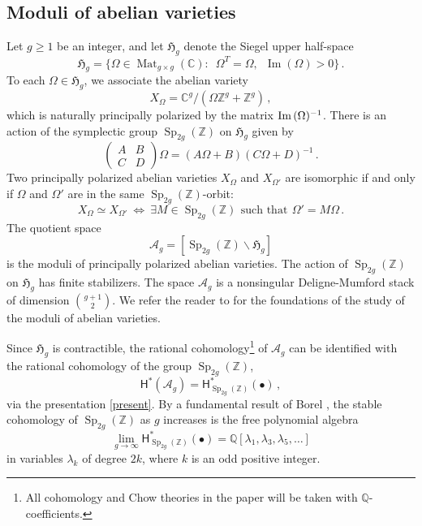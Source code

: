 \documentclass[11pt]{amsart}
\theoremstyle{definition}
\newcommand{\qq}{\mathbb{Q}}
\DeclareMathOperator{\Sp}{Sp}
\DeclareMathOperator{\im}{Im}
\begin{document}
\subsection{Moduli of abelian varieties} Let $g\geq 1$ be an integer, and let $\mathfrak H_g$ denote the Siegel upper half-space $$\mathfrak H_g=\{\Omega \in \operatorname {Mat} _{g \times g}(\mathbb {C} ):\,\,\,\Omega ^{T}=\Omega ,\,\,\,\im (\Omega )>0\} \, .$$ To each $\Omega\in \mathfrak H_g$, we associate the abelian variety $$X_{\Omega}=\mathbb C^{g}/(\Omega \mathbb Z^g+\mathbb Z^g)\, ,$$ which is naturally principally polarized by the matrix $\text{Im\,} (\Omega)^{-1}$. There is an action of the symplectic group $\Sp_{2g}(\mathbb Z)$ on $\mathfrak H_g$ given by 
$$\begin{pmatrix} A & B \\ C & D\end{pmatrix} \Omega= (A\Omega + B)(C\Omega+D)^{-1} \,.$$
Two principally polarized abelian varieties 
$X_{\Omega}$ and $X_{\Omega'}$
are isomorphic if and only if
$\Omega$ and $\Omega'$ are
in the same $\Sp_{2g}(\mathbb Z)$-orbit:
$$X_{\Omega}\simeq X_{\Omega'}\ \iff\  
\exists M\in \Sp_{2g}(\mathbb Z)  \ \, {\text {such that}} \
\, \Omega'=M\Omega\, .$$
The quotient space \begin{equation}\label{present}\mathcal A_g=\left[\Sp_{2g}(\mathbb Z)\backslash \mathfrak H_g\right]\end{equation} is the moduli  of principally polarized abelian varieties. The action of $\Sp_{2g}(\mathbb Z)$ on $\mathfrak H_g$ has finite stabilizers. The space $\mathcal A_g$ is a nonsingular Deligne-Mumford stack of dimension %
$\binom{g+1}{2}$.
We refer the reader to \cite{BL} for the 
foundations of the study of the moduli of
abelian varieties.

Since $\mathfrak{H}_g$
is contractible,
the rational cohomology{\footnote{All cohomology and Chow theories in the paper will be taken with $\qq$-coefficients.}} of $\mathcal A_g$ can be identified with the rational cohomology of the group $\Sp_{2g}(\mathbb Z)$,
$$\mathsf{H}^*(\mathcal{A}_g)=
\mathsf{H}^*_{\Sp_{2g}(\mathbb Z)}(\bullet)\, ,$$
via  the presentation \eqref{present}.  
 By a fundamental result of Borel \cite{B}, the 
stable cohomology of $\Sp_{2g}(\mathbb Z)$ as $g$ increases is  the free polynomial algebra 
\begin{equation} \label{borel}
\lim_{g\rightarrow \infty}
\mathsf{H}^*_{\Sp_{2g}(\mathbb Z)}(\bullet)
= \mathbb{Q}[\lambda_1,
\lambda_3, \lambda_5, \ldots]
\end{equation}
in variables $\lambda_{k}$ of
degree $2k$, where $k$ is an odd positive integer. 
\end{document}
